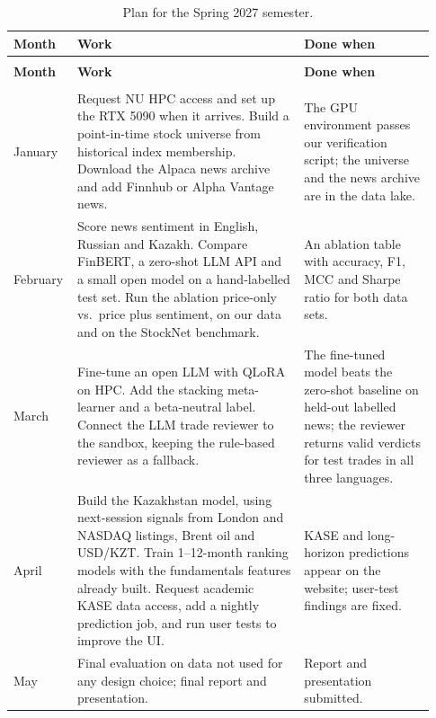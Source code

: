 {\small
\begin{longtable}{@{}>{\raggedright\arraybackslash}p{0.11\linewidth}
                    >{\raggedright\arraybackslash}p{0.52\linewidth}
                    >{\raggedright\arraybackslash}p{0.30\linewidth}@{}}
\caption{Plan for the Spring 2027 semester.}
\label{tab:spring}\\
\toprule
\textbf{Month} & \textbf{Work} & \textbf{Done when} \\
\midrule
\endfirsthead
\multicolumn{3}{@{}l}{\small\emph{Table~\ref{tab:spring} continued}}\\
\toprule
\textbf{Month} & \textbf{Work} & \textbf{Done when} \\
\midrule
\endhead
\midrule
\multicolumn{3}{r@{}}{\small\emph{continued on the next page}}\\
\endfoot
\bottomrule
\endlastfoot

January &
Request NU HPC access and set up the RTX 5090 when it arrives. Build a
point-in-time stock universe from historical index membership. Download the
Alpaca news archive and add Finnhub or Alpha Vantage news. &
The GPU environment passes our verification script; the universe and the news
archive are in the data lake. \\
\addlinespace

February &
Score news sentiment in English, Russian and Kazakh. Compare FinBERT, a
zero-shot LLM API and a small open model on a hand-labelled test set. Run the
ablation price-only vs.\ price plus sentiment, on our data and on the StockNet
benchmark. &
An ablation table with accuracy, F1, MCC and Sharpe ratio for both data sets. \\
\addlinespace

March &
Fine-tune an open LLM with QLoRA on HPC. Add the stacking meta-learner and a
beta-neutral label. Connect the LLM trade reviewer to the sandbox, keeping the
rule-based reviewer as a fallback. &
The fine-tuned model beats the zero-shot baseline on held-out labelled news; the
reviewer returns valid verdicts for test trades in all three languages. \\
\addlinespace

April &
Build the Kazakhstan model, using next-session signals from London and NASDAQ
listings, Brent oil and USD/KZT. Train 1--12-month ranking models with the
fundamentals features already built. Request academic KASE data access, add a
nightly prediction job, and run user tests to improve the UI. &
KASE and long-horizon predictions appear on the website; user-test findings are
fixed. \\
\addlinespace

May &
Final evaluation on data not used for any design choice; final report and
presentation. &
Report and presentation submitted. \\

\end{longtable}
}
